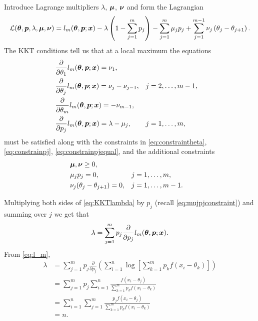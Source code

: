 	Introduce Lagrange multipliers $\lambda$, ${\bm{{\mu}}}$, ${\bm{{\nu}}}$ and form the Lagrangian
	\begin{equation}
		\mathcal{L}({\bm{{\theta}}},{\bm{{p}}},\lambda,{\bm{{\mu}}},{\bm{{\nu}}}) = l_m({\bm{{\theta}}},{\bm{{p}}};{\bm{{x}}}) - \lambda\left(1 - \sum_{j=1}^m p_j\right) - \sum_{j=1}^m \mu_j p_j + \sum_{j=1}^{m-1} \nu_j \left(\theta_j - \theta_{j+1}\right).
		\label{eq:kkt lagrangian}
	\end{equation}
	The KKT conditions tell us that at a local maximum the equations
	\begin{align}
		&\frac{\partial}{\partial \theta_1} l_m({\bm{{\theta}}},{\bm{{p}}};{\bm{{x}}}) = \nu_1, \label{eq:KKTtheta1}\\ 
		&\frac{\partial}{\partial \theta_j} l_m({\bm{{\theta}}},{\bm{{p}}};{\bm{{x}}}) = \nu_j - \nu_{j-1}, &&j=2,\dots,m-1 \label{eq:KKTtheta},\\ 
		&\frac{\partial}{\partial \theta_m} l_m({\bm{{\theta}}},{\bm{{p}}};{\bm{{x}}}) = -\nu_{m-1} \label{eq:KKTthetam},\\ 
		&\frac{\partial}{\partial p_j} l_m({\bm{{\theta}}},{\bm{{p}}};{\bm{{x}}}) = \lambda - \mu_j, && j = 1,\dots,m, \label{eq:KKTlambda}
	\end{align}
	must be satisfied along with the constraints in \eqref{eq:constraintheta}, \eqref{eq:constrainpj}, \eqref{eq:constrainpjequal}, and the additional constraints
	\begin{align}
		&{\bm{{\mu}}},{\bm{{\nu}}} \geq 0,\\
		&\mu_j p_j = 0, &&j=1,\dots,m, \label{eq:mujpjconstraint}\\
		&\nu_j (\theta_j - \theta_{j+1}) = 0, &&j=1,\dots,m-1.
		\label{eq:nujthetajconstraint}
	\end{align}

	Multiplying both sides of \eqref{eq:KKTlambda} by $p_j$ (recall \eqref{eq:mujpjconstraint}) and summing over $j$ we get that
	\begin{equation}
		\lambda = \sum_{j = 1}^m p_j \frac{\partial}{\partial p_j} l_m({\bm{{\theta}}},{\bm{{p}}};{\bm{{x}}}).
	\end{equation}
	From \eqref{eq:l_m},
	\begin{align}
		\lambda &= \sum_{j = 1}^m p_j \frac{\partial}{\partial p_j} \left( \sum_{i=1}^n \log \left[\sum_{k=1}^m p_k f(x_i - \theta_k) \right] \right)\\
			&= \sum_{j = 1}^m p_j \sum_{i=1}^n \frac{f(x_i - \theta_j)}{\sum_{k=1}^m p_k f(x_i - \theta_k)}\\
			&= \sum_{i=1}^n \sum_{j=1}^m  \frac{p_j f(x_i - \theta_j)}{\sum_{k=1}^m p_k f(x_i - \theta_k)}\\
			&= n.
	\end{align}

